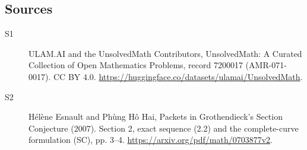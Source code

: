 \documentclass[11pt]{article}
\begin{document}
\subsection{Sources}
\begin{description}
\item[\hypertarget{source:7200017:1}{S1}] ULAM.AI and the UnsolvedMath Contributors, UnsolvedMath: A Curated Collection of Open Mathematics Problems, record 7200017 (AMR-071-0017). CC BY 4.0. \url{https://huggingface.co/datasets/ulamai/UnsolvedMath}.
\item[\hypertarget{source:7200017:2}{S2}] Hélène Esnault and Phùng Hô Hai, Packets in Grothendieck’s Section Conjecture (2007). Section 2, exact sequence (2.2) and the complete-curve formulation (SC), pp. 3–4. \url{https://arxiv.org/pdf/math/0703877v2}.
\end{description}
\label{end:7200017}
\end{document}
